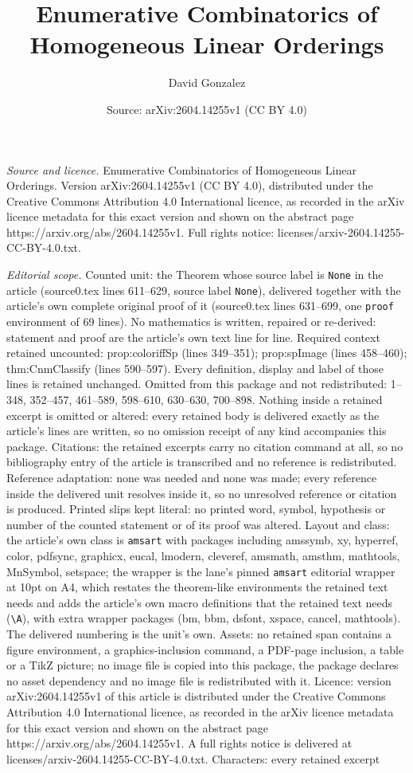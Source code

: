 \documentclass[10pt,a4paper]{amsart}
\title[Enumerative Combinatorics of Homogeneous Linear Orderings]{Enumerative Combinatorics of Homogeneous Linear Orderings}
\author{David Gonzalez}
\date{Source: arXiv:2604.14255v1 (CC BY 4.0)}
\begin{document}
\maketitle

\noindent\emph{Source and licence.} Enumerative Combinatorics of Homogeneous Linear Orderings. Version arXiv:2604.14255v1 (CC BY 4.0), distributed under the Creative Commons Attribution 4.0 International licence, as recorded in the arXiv licence metadata for this exact version and shown on the abstract page https://arxiv.org/abs/2604.14255v1. Full rights notice: licenses/arxiv-2604.14255-CC-BY-4.0.txt.\par\smallskip

\noindent\textit{Editorial scope.} Counted unit: the Theorem whose source label is \texttt{None} in the article (source0.tex lines 611--629, source label \texttt{None}), delivered together with the article's own complete original proof of it (source0.tex lines 631--699, one \texttt{proof} environment of 69 lines). No mathematics is written, repaired or re-derived: statement and proof are the article's own text line for line. Required context retained uncounted: prop:coloriffSp (lines 349--351); prop:spImage (lines 458--460); thm:CnmClassify (lines 590--597). Every definition, display and label of those lines is retained unchanged. Omitted from this package and not redistributed: 1--348, 352--457, 461--589, 598--610, 630--630, 700--898. Nothing inside a retained excerpt is omitted or altered: every retained body is delivered exactly as the article's lines are written, so no omission receipt of any kind accompanies this package. Citations: the retained excerpts carry no citation command at all, so no bibliography entry of the article is transcribed and no reference is redistributed. Reference adaptation: none was needed and none was made; every reference inside the delivered unit resolves inside it, so no unresolved reference or citation is produced. Printed slips kept literal: no printed word, symbol, hypothesis or number of the counted statement or of its proof was altered. Layout and class: the article's own class is \texttt{amsart} with packages including amssymb, xy, hyperref, color, pdfsync, graphicx, eucal, lmodern, cleveref, amsmath, amsthm, mathtools, MnSymbol, setspace; the wrapper is the lane's pinned \texttt{amsart} editorial wrapper at 10pt on A4, which restates the theorem-like environments the retained text needs and adds the article's own macro definitions that the retained text needs (\texttt{\textbackslash A}), with extra wrapper packages (bm, bbm, dsfont, xspace, cancel, mathtools). The delivered numbering is the unit's own. Assets: no retained span contains a figure environment, a graphics-inclusion command, a PDF-page inclusion, a table or a TikZ picture; no image file is copied into this package, the package declares no asset dependency and no image file is redistributed with it. Licence: version arXiv:2604.14255v1 of this article is distributed under the Creative Commons Attribution 4.0 International licence, as recorded in the arXiv licence metadata for this exact version and shown on the abstract page https://arxiv.org/abs/2604.14255v1. A full rights notice is delivered at licenses/arxiv-2604.14255-CC-BY-4.0.txt. Characters: every retained excerpt 
\end{document}
